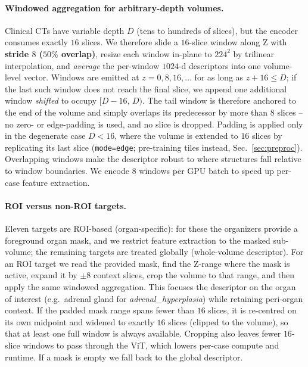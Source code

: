 \documentclass[runningheads]{llncs}
\begin{document}
\paragraph{Windowed aggregation for arbitrary-depth volumes.}
\label{sec:agg}
Clinical CTs have variable depth $D$ (tens to hundreds of slices), but the
encoder consumes exactly $16$ slices. We therefore slide a $16$-slice window
along Z with \textbf{stride $8$ ($50\%$ overlap)}, resize each window in-plane to
$224^2$ by trilinear interpolation, and \emph{average} the per-window $1024$-d
descriptors into one volume-level vector. Windows are emitted at
$z=0,8,16,\dots$ for as long as $z+16\le D$; if the last such window does not
reach the final slice, we append one additional window \emph{shifted} to occupy
$[D-16,\,D)$. The tail window is therefore anchored to the end of the volume and
simply overlaps its predecessor by more than $8$ slices -- no zero- or
edge-padding is used, and no slice is dropped. Padding is applied only in the
degenerate case $D<16$, where the volume is extended to $16$ slices by
replicating its last slice (\texttt{mode=edge}; pre-training tiles instead, Sec.~\ref{sec:preproc}). Overlapping windows make the
descriptor robust to where structures fall relative to window boundaries. We encode $8$ windows per GPU batch to speed up per-case
feature extraction.

\paragraph{ROI versus non-ROI targets.}
Eleven targets are ROI-based (organ-specific): for these the organizers provide a
foreground organ mask, and we restrict feature extraction to the masked
sub-volume; the remaining targets are treated globally (whole-volume descriptor).
For an ROI target we read the provided mask, find the Z-range where the mask is
active, expand it by $\pm 8$ context slices, crop the volume to that range, and
then apply the same windowed aggregation. This focuses the descriptor on the
organ of interest (e.g.\ adrenal gland for \emph{adrenal\_hyperplasia}) while
retaining peri-organ context. If the padded mask range spans fewer than $16$
slices, it is re-centred on its own midpoint and widened to exactly $16$ slices
(clipped to the volume), so that at least one full window is always available.
Cropping also leaves fewer $16$-slice windows to pass through the ViT, which
lowers per-case compute and runtime. If a mask is empty we fall back to the
global descriptor.
\end{document}
